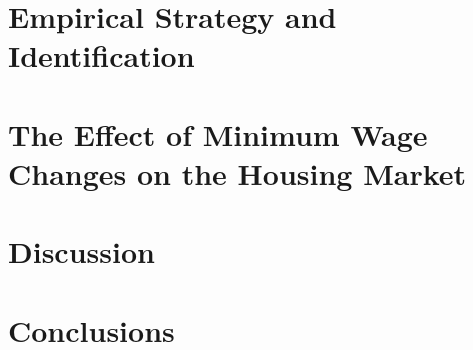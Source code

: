 \documentclass{article}
\begin{document}
\section{Empirical Strategy and Identification}\label{sec:empirical_strategy}
    

\section{The Effect of Minimum Wage Changes on the Housing Market}\label{sec:results}
    

\section{Discussion}\label{sec:discussion}
	

\section{Conclusions}\label{sec:conclusion}
    



\clearpage
\printbibliography

\clearpage

\clearpage



\clearpage

\section*{}
\vspace{5mm}

\appendix

\renewcommand\thetable{\thesection.\arabic{table}}    
\renewcommand\thefigure{\thesection.\arabic{figure}} 
\setcounter{table}{0}
\setcounter{figure}{0}


\end{document}
